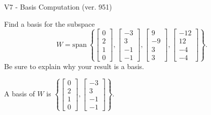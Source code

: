 \begin{exercise}
  \begin{exerciseTitle}V7 - Basis Computation (ver. 951)\end{exerciseTitle}
  \begin{exerciseStatement}
    Find a basis for the subspace 
\[W=\mathrm{span}\ \left\{\left[\begin{array}{r}
0 \\
2 \\
1 \\
0
\end{array}\right] , \left[\begin{array}{r}
-3 \\
3 \\
-1 \\
-1
\end{array}\right] , \left[\begin{array}{r}
9 \\
-9 \\
3 \\
3
\end{array}\right] , \left[\begin{array}{r}
-12 \\
12 \\
-4 \\
-4
\end{array}\right]\right\}.\]
 Be sure to explain why your result is a basis.


  \end{exerciseStatement}
  \begin{exerciseAnswer}
   A basis of \(W\) is  \(\left\{\left[\begin{array}{r}
0 \\
2 \\
1 \\
0
\end{array}\right] , \left[\begin{array}{r}
-3 \\
3 \\
-1 \\
-1
\end{array}\right]\right\}\).
  


  \end{exerciseAnswer}
\end{exercise}